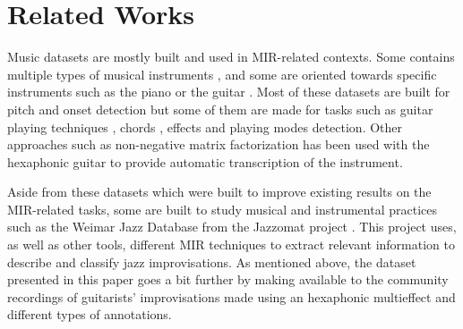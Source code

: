 \documentclass{article}
\begin{document}

\section{Related Works}\label{sec:related_works}


Music datasets are mostly built and used in MIR-related contexts.  Some contains multiple types of musical instruments \cite{thickstun2017learning}, and some are oriented towards specific instruments such as the piano \cite{Emiya2010MAPS, hawthorne2018} or the guitar \cite{Kehling2014, sci:Xi2018}. Most of these datasets are built for pitch and onset detection but some of them are made for tasks such as guitar playing techniques \cite{sci:Su2014a}, chords \cite{nadar2019Chords}, effects \cite{Stein2010} and playing modes \cite{Foulon2014} detection.  Other approaches such as non-negative matrix factorization has been used with the hexaphonic guitar \cite{sci:OGrady2009} to provide automatic transcription of the instrument.

Aside from these datasets which were built to improve existing results on the MIR-related tasks, some are built to study musical and instrumental practices such as the Weimar Jazz Database from the Jazzomat project \cite{Pfleiderer:2017:BOOK}. This project uses, as well as other tools, different MIR techniques to extract relevant information to describe and classify jazz improvisations. As mentioned above, the dataset presented in this paper goes a bit further by making available to the community recordings of guitarists' improvisations made using an hexaphonic multieffect and different types of annotations.
\end{document}
